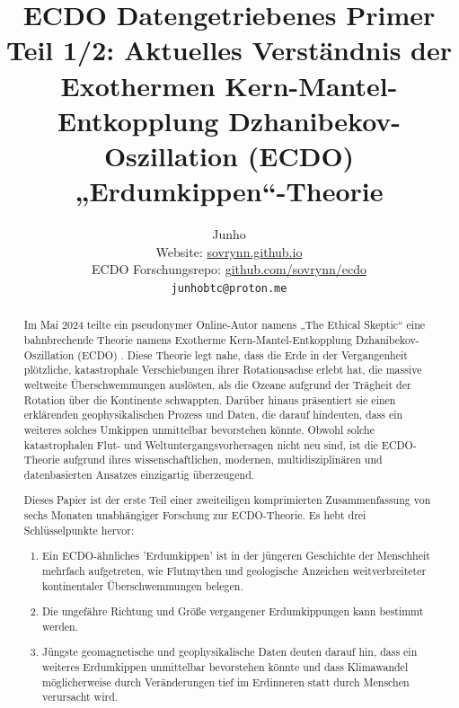 \documentclass[10pt,twocolumn,letterpaper]{article}
\begin{document}
\title{ECDO Datengetriebenes Primer Teil 1/2: Aktuelles Verständnis der Exothermen Kern-Mantel-Entkopplung Dzhanibekov-Oszillation (ECDO) „Erdumkippen“-Theorie}

\author{Junho\\
Website: \href{https://sovrynn.github.io}{sovrynn.github.io}\\
ECDO Forschungsrepo: \href{https://github.com/sovrynn/ecdo}{github.com/sovrynn/ecdo}\\
{\tt\small junhobtc@proton.me}
}

\maketitle

\begin{abstract}
Im Mai 2024 teilte ein pseudonymer Online-Autor namens „The Ethical Skeptic“ \cite{0} eine bahnbrechende Theorie namens Exotherme Kern-Mantel-Entkopplung Dzhanibekov-Oszillation (ECDO) \cite{1}. Diese Theorie legt nahe, dass die Erde in der Vergangenheit plötzliche, katastrophale Verschiebungen ihrer Rotationsachse erlebt hat, die massive weltweite Überschwemmungen auslösten, als die Ozeane aufgrund der Trägheit der Rotation über die Kontinente schwappten. Darüber hinaus präsentiert sie einen erklärenden geophysikalischen Prozess und Daten, die darauf hindeuten, dass ein weiteres solches Umkippen unmittelbar bevorstehen könnte. Obwohl solche katastrophalen Flut- und Weltuntergangsvorhersagen nicht neu sind, ist die ECDO-Theorie aufgrund ihres wissenschaftlichen, modernen, multidisziplinären und datenbasierten Ansatzes einzigartig überzeugend.

Dieses Papier ist der erste Teil einer zweiteiligen komprimierten Zusammenfassung von sechs Monaten unabhängiger Forschung \cite{2,20} zur ECDO-Theorie. Es hebt drei Schlüsselpunkte hervor:

\begin{flushleft}
\begin{enumerate}
    \item Ein ECDO-ähnliches 'Erdumkippen' ist in der jüngeren Geschichte der Menschheit mehrfach aufgetreten, wie Flutmythen und geologische Anzeichen weitverbreiteter kontinentaler Überschwemmungen belegen.
    \item Die ungefähre Richtung und Größe vergangener Erdumkippungen kann bestimmt werden.
    \item Jüngste geomagnetische und geophysikalische Daten deuten darauf hin, dass ein weiteres Erdumkippen unmittelbar bevorstehen könnte und dass Klimawandel möglicherweise durch Veränderungen tief im Erdinneren statt durch Menschen verursacht wird.
\end{enumerate}
\end{flushleft}


\end{abstract}
\end{document}
